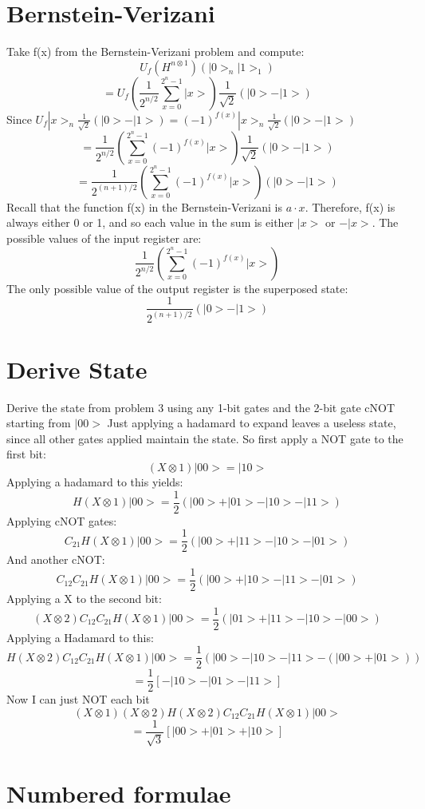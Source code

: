 \documentclass[12pt]{article}
\begin{document}
\section{Bernstein-Verizani}

Take f(x) from the Bernstein-Verizani problem and compute:
$$U_{f}(H^{n \otimes 1})(|0>_{n}|1>_{1})$$
$$ = U_{f} (\frac{1}{2^{n/2}}\displaystyle\sum\limits_{x=0}^{2^{n} - 1} |x>) \frac{1}{\sqrt{2}}(|0> - |1>)$$
Since $ U_{f}|x>_{n} \frac{1}{\sqrt{2}}(|0>-|1>) = (-1)^{f(x)}|x>_{n} \frac{1}{\sqrt{2}}(|0> - |1>) $
$$ = \frac{1}{2^{n/2}} (\displaystyle\sum\limits_{x=0}^{2^{n} - 1} (-1)^{f(x)}|x>) \frac{1}{\sqrt{2}}(|0> - |1>) $$
\[
\boxed{ = \frac{1}{2^{(n+1)/2}} (\displaystyle\sum\limits_{x=0}^{2^{n} - 1} (-1)^{f(x)}|x>)(|0> - |1>)}
\]
Recall that the function f(x) in the Bernstein-Verizani is $ a \cdot x$. Therefore, f(x) is always either 0 or 1, and so each value in the sum is either $|x>$ or $-|x>$.
The possible values of the input register are:
\[
\boxed{\frac{1}{2^{n/2}} (\displaystyle\sum\limits_{x=0}^{2^{n} - 1} (-1)^{f(x)}|x>)}
\]
The only possible value of the output register is the superposed state:
\[
\boxed{ \frac{1}{2^{(n+1)/2}}(|0> - |1>)}
\]

\section{Derive State}
Derive the state from problem 3 using any 1-bit gates and the 2-bit gate cNOT starting from $|00>$
Just applying a hadamard to expand leaves a useless state, since all other gates applied maintain the state. So first apply a NOT gate to the first bit:
$$(X \otimes 1)|00> = |10>$$
Applying a hadamard to this yields:
$$H(X \otimes 1)|00> =  \frac{1}{2}(|00> + |01> - |10> - |11>)$$
Applying cNOT gates:
$$C_{21}H(X \otimes 1)|00> =  \frac{1}{2}(|00> + |11> - |10> - |01>)$$
And another cNOT:
$$C_{12}C_{21}H(X \otimes 1)|00> =  \frac{1}{2}(|00> + |10> - |11> - |01>)$$
Applying a X to the second bit:
$$(X \otimes 2)C_{12}C_{21}H(X \otimes 1)|00> =  \frac{1}{2}(|01> + |11> - |10> - |00>)$$
Applying a Hadamard to this:
$$H(X \otimes 2)C_{12}C_{21}H(X \otimes 1)|00> =  \frac{1}{2}(|00> - |10> - |11> - (|00>+|01>))$$
$$ = \frac{1}{2}[-|10> - |01> - |11>]$$
Now I can just NOT each bit
$$(X \otimes 1)(X \otimes 2)H(X \otimes 2)C_{12}C_{21}H(X \otimes 1)|00> $$
\[
\boxed{=  \frac{1}{\sqrt{3}}[|00> + |01> + |10>]}
\]

\section{Numbered formulae}
\end{document}
